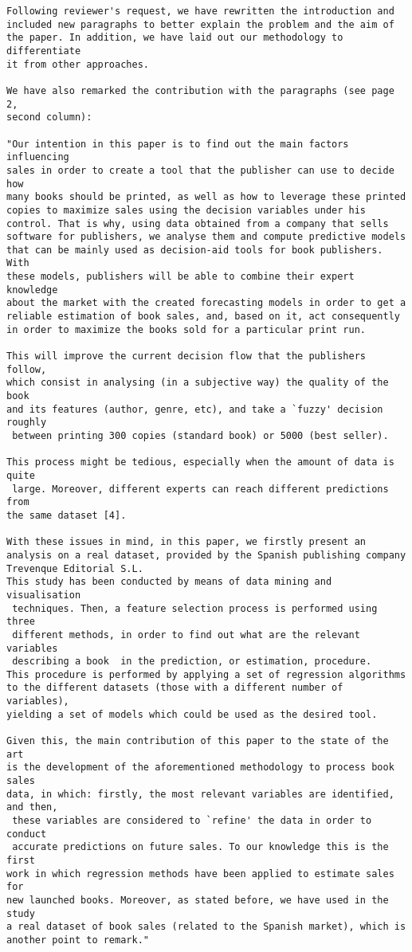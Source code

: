 \documentclass[preprint]{elsarticle}
\begin{document}
\begin{verbatim}
Following reviewer's request, we have rewritten the introduction and 
included new paragraphs to better explain the problem and the aim of 
the paper. In addition, we have laid out our methodology to differentiate 
it from other approaches.

We have also remarked the contribution with the paragraphs (see page 2,
second column):

"Our intention in this paper is to find out the main factors influencing
sales in order to create a tool that the publisher can use to decide how 
many books should be printed, as well as how to leverage these printed
copies to maximize sales using the decision variables under his
control. That is why, using data obtained from a company that sells
software for publishers, we analyse them and compute predictive models 
that can be mainly used as decision-aid tools for book publishers. With 
these models, publishers will be able to combine their expert knowledge 
about the market with the created forecasting models in order to get a 
reliable estimation of book sales, and, based on it, act consequently 
in order to maximize the books sold for a particular print run. 

This will improve the current decision flow that the publishers follow, 
which consist in analysing (in a subjective way) the quality of the book 
and its features (author, genre, etc), and take a `fuzzy' decision roughly
 between printing 300 copies (standard book) or 5000 (best seller).

This process might be tedious, especially when the amount of data is quite
 large. Moreover, different experts can reach different predictions from 
the same dataset [4].

With these issues in mind, in this paper, we firstly present an 
analysis on a real dataset, provided by the Spanish publishing company 
Trevenque Editorial S.L.
This study has been conducted by means of data mining and visualisation
 techniques. Then, a feature selection process is performed using three
 different methods, in order to find out what are the relevant variables
 describing a book  in the prediction, or estimation, procedure. 
This procedure is performed by applying a set of regression algorithms 
to the different datasets (those with a different number of variables), 
yielding a set of models which could be used as the desired tool. 

Given this, the main contribution of this paper to the state of the art 
is the development of the aforementioned methodology to process book sales 
data, in which: firstly, the most relevant variables are identified, and then,
 these variables are considered to `refine' the data in order to conduct
 accurate predictions on future sales. To our knowledge this is the first 
work in which regression methods have been applied to estimate sales for 
new launched books. Moreover, as stated before, we have used in the study 
a real dataset of book sales (related to the Spanish market), which is 
another point to remark."

\end{verbatim}
\end{document}
